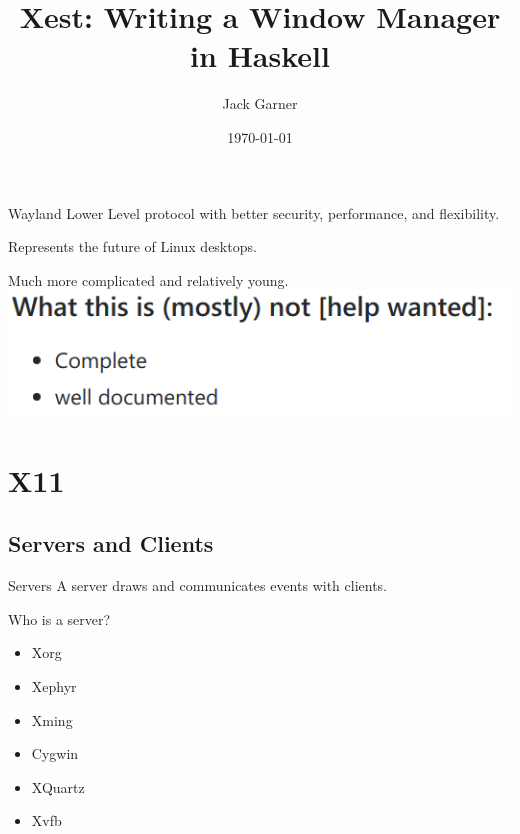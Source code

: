 \documentclass[10pt]{beamer}
\title{Xest: Writing a Window Manager in Haskell}
\subtitle{}
\date{\today}
\author{Jack Garner}
\institute{CSM LUG}
\begin{document}
\maketitle

\begin{frame}[fragile]{Wayland}
  Lower Level protocol with better security, performance, and flexibility.

  Represents the future of Linux desktops.

  \pause
  Much more complicated and relatively young.
  \includegraphics{hsroots}
\end{frame}

\section{X11}
\subsection{Servers and Clients}

\begin{frame}[fragile]{Servers}
  A server draws and communicates events with clients.
  \pause

  Who is a server?
  \pause

  \begin{itemize}
    \item Xorg
    \item Xephyr
    \item Xming
    \item Cygwin
    \item XQuartz
    \item Xvfb
  \end{itemize}
\end{frame}
\end{document}
